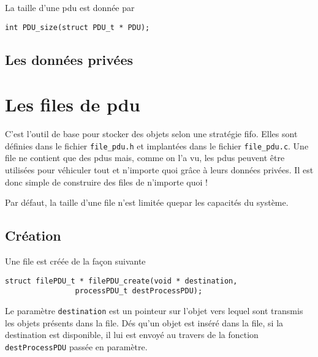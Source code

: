 \documentclass{article}
\begin{document}
   La taille d'une {\sc pdu} est donnée par

\begin{verbatim}
int PDU_size(struct PDU_t * PDU);
\end{verbatim}

%
\subsection{Les données privées}

%
\section{Les files de {\sc pdu}}
\label{section:file}

   C'est l'outil de base pour stocker des objets selon une stratégie
{\sc fifo}. Elles sont définies dans le fichier {\tt file\_pdu.h} et
implantées dans le fichier {\tt file\_pdu.c}. Une file ne contient que
des {\sc pdu}s mais, comme on l'a vu, les {\sc pdu}s peuvent être
utilisées pour véhiculer tout et n'importe quoi grâce à leurs données
privées. Il est donc simple de construire des files de n'importe quoi
!

   Par défaut, la taille d'une file n'est limitée quepar les capacités
du système.

%
\subsection{Création}

   Une file est créée de la façon suivante 

\begin{verbatim}
struct filePDU_t * filePDU_create(void * destination,
			    processPDU_t destProcessPDU);
\end{verbatim}

   Le paramètre \lstinline!destination! est un pointeur sur l'objet
vers lequel sont transmis les objets présents dans la file. Dés qu'un
objet est inséré dans la file, si la destination est disponible, il
lui est envoyé au travers de la fonction \lstinline!destProcessPDU!
passée en paramètre.
\end{document}

